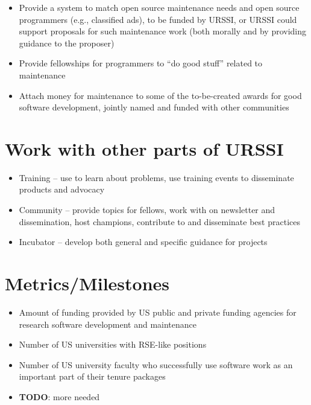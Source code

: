 \documentclass[
]{book}
\begin{document}
\begin{itemize}
\item
  Provide a system to match open source maintenance needs and open source programmers
  (e.g., classified ads), to be funded by URSSI, or URSSI could support proposals for such
  maintenance work (both morally and by providing guidance to the proposer)
\item
  Provide fellowships for programmers to ``do good stuff'' related to maintenance
\item
  Attach money for maintenance to some of the to-be-created awards for good software
  development, jointly named and funded with other communities
\end{itemize}

\hypertarget{work-with-other-parts-of-urssi}{%
\section{Work with other parts of URSSI}\label{work-with-other-parts-of-urssi}}

\begin{itemize}
\item
  Training -- use to learn about problems, use training events to disseminate products and advocacy
\item
  Community -- provide topics for fellows, work with on newsletter and dissemination, host champions,
  contribute to and disseminate best practices
\item
  Incubator -- develop both general and specific guidance for projects
\end{itemize}

\hypertarget{metricsmilestones}{%
\section{Metrics/Milestones}\label{metricsmilestones}}

\begin{itemize}
\item
  Amount of funding provided by US public and private funding agencies for research software
  development and maintenance
\item
  Number of US universities with RSE-like positions
\item
  Number of US university faculty who successfully use software work as an important part of
  their tenure packages
\item
  \textbf{TODO}: more needed
\end{itemize}
\end{document}

